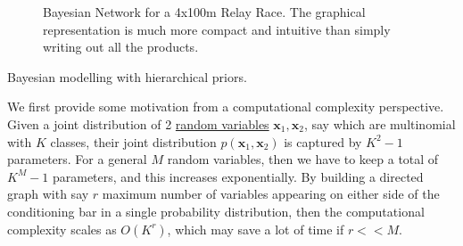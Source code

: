 \documentclass{article}
\begin{document}
\begin{example}
\begin{figure}[H]
      \caption{Bayesian Network for a 4x100m Relay Race. The graphical representation is much more compact and intuitive than simply writing out all the products. }
      \label{fig:relay_race}
    \end{figure}
  \end{example} 

  Bayesian modelling with hierarchical priors. 

  \begin{example}[Multinomial]
    \label{ex:multinomial}
    We first provide some motivation from a computational complexity perspective. Given a joint distribution of 2 \hyperref[prob-def:random-variable]{random variables} $\mathbf{x}_1, \mathbf{x}_2$, say which are multinomial with $K$ classes, their joint distribution $p(\mathbf{x}_1, \mathbf{x}_2)$ is captured by $K^2 - 1$ parameters. For a general $M$ random variables, then we have to keep a total of $K^M - 1$ parameters, and this increases exponentially. By building a directed graph with say $r$ maximum number of variables appearing on either side of the conditioning bar in a single probability distribution, then the computational complexity scales as $O(K^r)$, which may save a lot of time if $r << M$. 
  \end{example}
\end{document}
